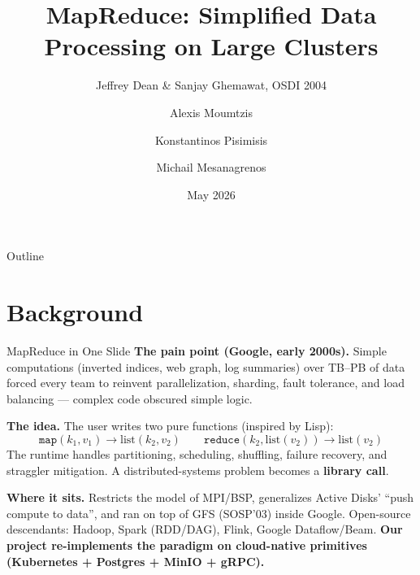 \documentclass[11pt]{beamer}
\date[May 2026]{May 2026}
\author[Technical University of Crete]{Alexis Moumtzis \and Konstantinos Pisimisis \and Michail Mesanagrenos}
\title[MapReduce on Kubernetes --- INF-419]{MapReduce: Simplified Data Processing on Large Clusters}
\subtitle{Jeffrey Dean \& Sanjay Ghemawat, OSDI 2004}
\begin{document}
\begin{frame}
  \titlepage
\end{frame}

\begin{frame}{Outline}
  \tableofcontents[hideallsubsections]
\end{frame}

\section{Background}

\begin{frame}{MapReduce in One Slide}
\textbf{The pain point (Google, early 2000s).} Simple computations
(inverted indices, web graph, log summaries) over \alert{TB--PB} of data
forced every team to reinvent parallelization, sharding, fault tolerance,
and load balancing --- complex code obscured simple logic.

\vspace{0.4em}
\textbf{The idea.} The user writes \alert{two pure functions} (inspired by Lisp):
\[
\texttt{map}(k_1,v_1) \to \mathrm{list}(k_2,v_2) \qquad
\texttt{reduce}(k_2, \mathrm{list}(v_2)) \to \mathrm{list}(v_2)
\]
The \alert{runtime} handles partitioning, scheduling, shuffling, failure recovery,
and straggler mitigation. A distributed-systems problem becomes a \textbf{library call}.

\vspace{0.4em}
\textbf{Where it sits.} Restricts the model of MPI/BSP, generalizes Active Disks'
``push compute to data'', and ran on top of \alert{GFS} (SOSP'03) inside Google.
Open-source descendants: \alert{Hadoop}, \alert{Spark} (RDD/DAG), \alert{Flink},
Google \alert{Dataflow/Beam}. \textbf{Our project re-implements the paradigm on
cloud-native primitives (Kubernetes + Postgres + MinIO + gRPC).}
\end{frame}

\end{document}
